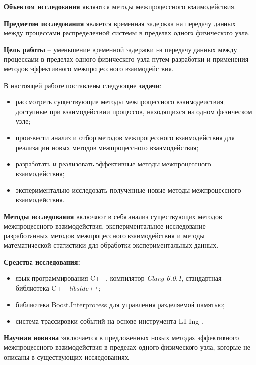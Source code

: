 \textbf{Объектом исследования} являются методы межпроцессного взаимодействия.

\textbf{Предметом исследования} является временная задержка на передачу данных между процессами распределенной системы в пределах одного физического узла.

\textbf{Цель работы} -- уменьшение временной задержки на передачу данных между процессами в пределах одного физического узла путем разработки и применения методов эффективного межпроцессного взаимодействия.

В настоящей работе поставлены следующие \textbf{задачи}:

\begin{itemize}
\item рассмотреть существующие методы межпроцессного взаимодействия, доступные при взаимодействии процессов, находящихся на одном физическом узле;
\item произвести анализ и отбор методов межпроцессного взаимодействия для реализации новых методов межпроцессного взаимодействия;
\item разработать и реализовать эффективные методы межпроцессного взаимодействия;
\item экспериментально исследовать полученные новые методы межпроцессного взаимодействия.
\end{itemize}

\textbf{Методы исследования} включают в себя анализ существующих методов межпроцессного взаимодействия, экспериментальное исследование разработанных методов межпроцессного взаимодействия и методы математической статистики для обработки экспериментальных данных.

\textbf{Средства исследования:}
\begin{itemize}
\item язык программирования C++, компилятор \textit{Clang 6.0.1}, стандартная библиотека C++ \textit{libstdc++};
\item библиотека Boost.Interprocess \cite{BoostInterprocess} для управления разделяемой памятью;
\item система трассировки событий \cite{LTTngThesis} на основе инструмента LTTng \cite{LTTngSite}.
\end{itemize}

\textbf{Научная новизна} заключается в предложенных новых методах эффективного межпроцессного взаимодействия в пределах одного физического узла, которые не описаны в существующих исследованиях.

